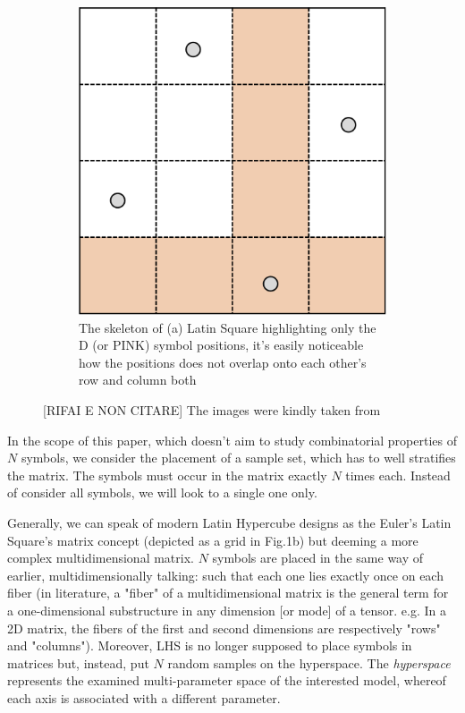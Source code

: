 \documentclass[12pt]{extarticle}
\newcommand{\midcaption}[1]{
    \captionsetup{justification=centering}
    \caption{#1}
}
\begin{document}
\begin{figure}[h]
\begin{subfigure}[b]{0.45\textwidth}
{        	\includegraphics[width=\textwidth]{src/imgs/latin_square_skeleton.png}
        	\caption{The skeleton of (a) Latin Square highlighting only the D (or PINK) symbol positions, it's easily noticeable how the positions does not overlap onto each other's row and column both}
        	\label{fig:latin_square_b}
        }
    \end{subfigure}
    
    \midcaption{[RIFAI E NON CITARE] The images were kindly taken from \fancycite{sheikholeslami2017}}
    \label{fig:latin_square}
\end{figure}

In the scope of this paper, which doesn't aim to study combinatorial properties of $N$ symbols, we consider the placement of a sample set, which has to well stratifies the matrix. The symbols must occur in the matrix exactly $N$ times each. Instead of consider all symbols, we will look to a single one only. 

Generally, we can speak of modern Latin Hypercube designs as the Euler's Latin Square's matrix concept (depicted as a grid in Fig.1b) but deeming a more complex multidimensional matrix. $N$ symbols are placed in the same way of earlier, multidimensionally talking: such that each one lies exactly once on each fiber (in literature, a "fiber" of a multidimensional matrix is the general term for a one-dimensional substructure in any dimension [or mode] of a tensor. e.g. In a 2D matrix, the fibers of the first and second dimensions are respectively "rows" and "columns").
Moreover, LHS is no longer supposed to place symbols in matrices but, instead, put $N$ random samples on the hyperspace. The \textit{hyperspace} represents the examined multi-parameter space of the interested model, whereof each axis is associated with a different parameter.
\end{document}
